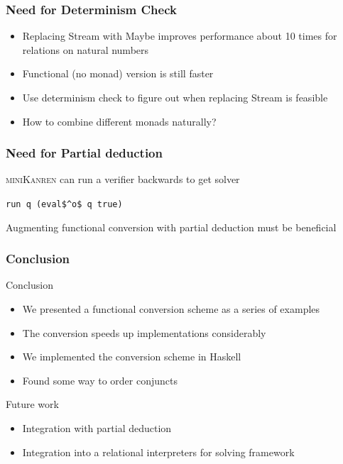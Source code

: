 \documentclass[xcolor=table]{beamer}
\newcommand{\mk}{\textsc{miniKanren}\xspace}
\begin{document}
\begin{frame}[fragile]
  \frametitle{Need for Determinism Check}
  \begin{itemize}
    \item Replacing Stream with Maybe improves performance about 10 times for relations on natural numbers
    \item Functional (no monad) version is still faster
    \item Use determinism check to figure out when replacing Stream is feasible
    \item How to combine different monads naturally?
  \end{itemize}
\end{frame}

\begin{frame}[fragile]
  \frametitle{Need for Partial deduction}

\begin{center}
\mk can run a verifier backwards to get solver
\end{center}

\begin{center}
\begin{minipage}{0.3\textwidth}
  \lstinline{run q (eval$^o$ q true)}
\end{minipage}

\begin{center}
  Augmenting functional conversion with partial deduction must be beneficial
\end{center}
\end{center}


\end{frame}


\begin{frame}[fragile]
  \frametitle{Conclusion}
Conclusion
  \begin{itemize}
    \item We presented a functional conversion scheme as a series of examples
    \item The conversion speeds up implementations considerably
    \item We implemented the conversion scheme in Haskell
    \item Found some way to order conjuncts
  \end{itemize}

\vfill

Future work
  \begin{itemize}
    \item Integration with partial deduction
    \item Integration into a relational interpreters for solving framework
  \end{itemize}
\end{frame}
\end{document}
